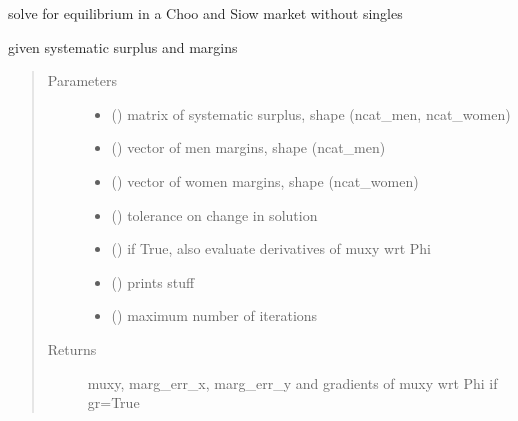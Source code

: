 \documentclass[letterpaper,10pt,english]{sphinxmanual}
\begin{document}
\begin{fulllineitems}
\label{\detokenize{ipfp_solvers:ipfp_solvers.ipfp_homo_nosingles_solver}}
solve for equilibrium in a Choo and Siow market without singles

given systematic surplus and margins
\begin{quote}\begin{description}
\item[{Parameters}] \leavevmode\begin{itemize}
\item {} 
 () \textendash{} matrix of systematic surplus, shape (ncat\_men, ncat\_women)

\item {} 
 () \textendash{} vector of men margins, shape (ncat\_men)

\item {} 
 () \textendash{} vector of women margins, shape (ncat\_women)

\item {} 
 () \textendash{} tolerance on change in solution

\item {} 
 () \textendash{} if True, also evaluate derivatives of muxy wrt Phi

\item {} 
 () \textendash{} prints stuff

\item {} 
 () \textendash{} maximum number of iterations

\end{itemize}

\item[{Returns}] \leavevmode
muxy, marg\_err\_x, marg\_err\_y
and gradients of muxy wrt Phi if gr=True

\end{description}\end{quote}

\end{fulllineitems}
\end{document}
